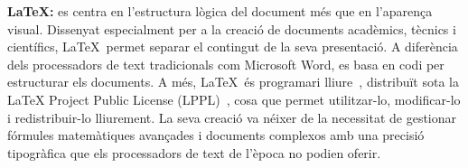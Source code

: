 \textbf{\LaTeX:} es centra en l’estructura lògica del document més que en l'aparença visual. Dissenyat especialment per a la creació de documents acadèmics, tècnics i científics, \LaTeX~permet separar el contingut de la seva presentació. A diferència dels processadors de text tradicionals com Microsoft Word, es basa en codi per estructurar els documents. A més, \LaTeX~és programari lliure~\cite{ProgramariLliure}, distribuït sota la LaTeX Project Public License (LPPL)~\cite{LPPL}, cosa que permet utilitzar-lo, modificar-lo i redistribuir-lo lliurement. La seva creació va néixer de la necessitat de gestionar fórmules matemàtiques avançades i documents complexos amb una precisió tipogràfica que els processadors de text de l’època no podien oferir.

